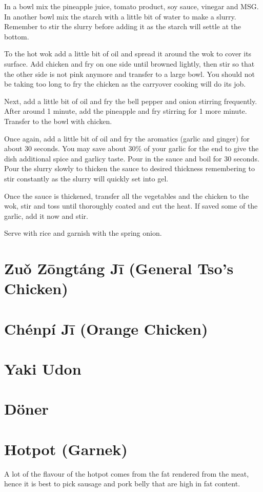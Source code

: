 \documentclass[11pt]{report}
\begin{document}
In a bowl mix the pineapple juice, tomato product, soy sauce, vinegar and MSG.
In another bowl mix the starch with a little bit of water to make a slurry.
Remember to stir the slurry before adding it as the starch will settle at the
bottom.

To the hot wok add a little bit of oil and spread it around the wok to cover
its surface. Add chicken and fry on one side until browned lightly, then stir
so that the other side is not pink anymore and transfer to a large bowl. You
should not be taking too long to fry the chicken as the carryover cooking will
do its job.

Next, add a little bit of oil and fry the bell pepper and onion stirring
frequently. After around 1 minute, add the pineapple and fry stirring for 1
more minute. Transfer to the bowl with chicken.

Once again, add a little bit of oil and fry the aromatics (garlic and ginger)
for about 30 seconds. You may save about 30\% of your garlic for the end to
give the dish additional spice and garlicy taste. Pour in the sauce and boil
for 30 seconds. Pour the slurry slowly to thicken the sauce to desired
thickness remembering to stir constantly as the slurry will quickly set into
gel.

Once the sauce is thickened, transfer all the vegetables and the chicken to the
wok, stir and toss until thoroughly coated and cut the heat. If saved some of
the garlic, add it now and stir.

Serve with rice and garnish with the spring onion.

\section{Zuǒ Zōngtáng Jī (General Tso's Chicken)}
\section{Chénpí Jī (Orange Chicken)}
\section{Yaki Udon}
\section{Döner}

\section{Hotpot (Garnek)}
A lot of the flavour of the hotpot comes from the fat rendered from the meat,
hence it is best to pick sausage and pork belly that are high in fat content.
\end{document}
